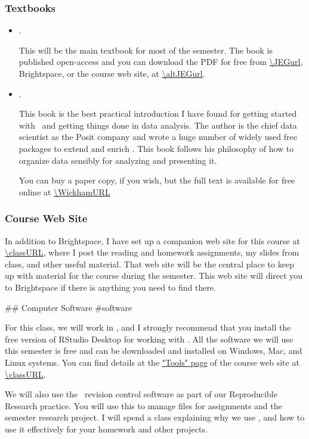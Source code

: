 \documentclass[11pt,twoside]{jgsyllabus}\usepackage[]{graphicx}\usepackage[]{xcolor}
\begin{document}
\subsubsection{Textbooks}
\begin{itemize}
	 \item \LongJEGbook.

     This will be the main textbook for most of the semester. The book is
     published open-access and you can download the PDF for free from
     \url{\JEGurl}, Brightspace, or the course web site, at \url{\altJEGurl}.


  \item \LongWickham.

    This book is the best practical introduction I have found for getting
    started with \Rstats\ and getting things done in data analysis.
    The author is the chief data scientist as the Posit company and wrote a huge
    number of widely used free packages to extend and enrich \Rstats.
    This book follows his philosophy of how to organize data sensibly for
    analyzing and presenting it.

    You can buy a paper copy, if you wish, but the full text is available for
    free online at \url{\WickhamURL}

\end{itemize}

\subsubsection{Course Web Site}

In addition to Brightspace, I have set up a companion web site for this
course at \url{\classURL},
where I post the reading and homework assignments,
my slides from class, and other useful material. That web site will be the
central place to keep up with material for the course during the semester.
This web site will direct you to Brightspace if there is anything you need to
find there.

## Computer Software {#software}

For this class, we will work in \Rstats,
and I strongly recommend that you install
the free version of RStudio Desktop for working with \Rstats.
All the software we will use this semester is free and can be downloaded and
installed on Windows, Mac, and Linux systems. You can find details at the
\href{\classURL/tools/}{"Tools" page} of the course web site at
\url{\classURL}.

We will also use the \git\ revision control software as part of our
Reproducible Research practice. You will use this to manage files
for assignments and the semester research project.
I will spend a class explaining why we use \git, and how
to use it effectively for your homework and other projects.
\end{document}

